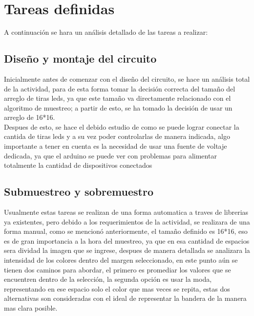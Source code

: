\documentclass{article}
\begin{document}
\section{Tareas definidas} \label{contenido}
A continuación se hara un análisis detallado de las tareas a realizar: 
\subsection{Diseño y montaje del circuito}
Inicialmente antes de comenzar con el diseño del circuito, se hace un análisis total de la actividad, para de esta forma tomar la decisión correcta del tamaño del arreglo de tiras leds, ya que este tamaño va directamente relacionado con el algoritmo de muestreo; a partir de esto, se ha tomado la decisión de usar un arreglo de 16*16.\\
Despues de esto, se hace el debido estudio de como se puede lograr conectar la cantida de tiras leds y a su vez poder controlarlas de manera indicada, algo importante a tener en cuenta es la necesidad de usar una fuente de voltaje dedicada, ya que el arduino se puede ver con problemas para alimentar totalmente la cantidad de dispositivos conectados


\subsection{Submuestreo y sobremuestro}
Usualmente estas tareas se realizan de una forma automatica a traves de librerias ya existentes, pero debido a los requerimientos de la actividad, se realizara de una forma manual, como se mencionó anteriormente, el tamaño definido es 16*16, eso es de gran importancia a la hora del muestreo, ya que en esa cantidad de espacios sera dividad la imagen que se ingrese, despues de manera detallada se analizara la intensidad de los colores dentro del margen seleccionado, en este punto aún se tienen dos caminos para abordar, el primero es promediar los valores que se encuentren dentro de la selección, la segunda opción es usar la moda, representando en ese espacio solo el color que mas veces se repita, estas dos alternativas son consideradas con el ideal de representar la bandera de la manera mas clara posible.
\end{document}
